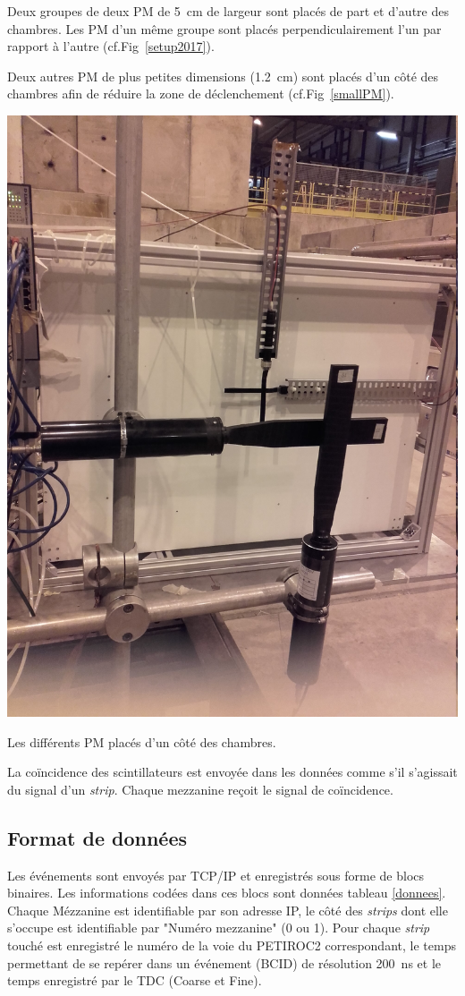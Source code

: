 Deux groupes de deux PM de \SI{5}{\centi\meter} de largeur sont placés de part et d'autre des chambres. Les PM d'un même groupe sont placés perpendiculairement l'un par rapport à l'autre (cf.Fig~\ref{setup2017}). 

Deux autres PM de plus petites dimensions (\SI{1.2}{\centi\meter}) sont placés d'un côté des chambres afin de réduire la zone de déclenchement (cf.Fig~\ref{smallPM}).  

\marginpar
{
	\centering
	\includegraphics[width=\marginparwidth]{ELE/BigSmallScintillators.jpg}
	\captionsetup{type=figure}\caption{Les différents PM placés d'un côté des chambres.}
	\label{smallPM}
}

La coïncidence des scintillateurs est envoyée dans les données comme s'il s'agissait du signal d'un \textit{strip}. Chaque mezzanine reçoit le signal de coïncidence.
\vspace*{-0.4cm}
\subsection{Format de données}
\vspace*{-0.4cm}
Les événements sont envoyés par TCP/IP et enregistrés sous forme de blocs binaires. Les informations codées dans ces blocs sont données tableau \ref{donnees}. Chaque Mézzanine est identifiable par son adresse IP, le côté des \textit{strips} dont elle s'occupe est identifiable par "Numéro mezzanine" (\num{0} ou \num{1}). Pour chaque \textit{strip} touché est enregistré le numéro de la voie du PETIROC2 correspondant, le temps permettant de se repérer dans un événement (BCID) de résolution \SI{200}{\nano\second} et le temps enregistré par le TDC (Coarse et Fine).

